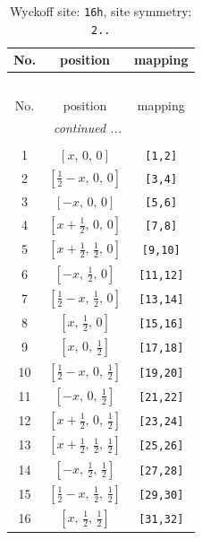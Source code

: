 \documentclass[fleqn,8pt]{jsarticle}
\begin{document}
\begin{longtable}{ccc}
\caption{Wyckoff site: {\tt 16h}, site symmetry: {\tt 2..}}
 \\
 \hline \hline
No. & position & mapping \\ \hline \endfirsthead

\multicolumn{2}{l}{\tablename\ \thetable{}} \\
 \hline \hline
No. & position & mapping \\ \hline \endhead

 \hline \hline
\multicolumn{2}{r}{\footnotesize\it continued ...} \\ \endfoot

 \hline \hline
\multicolumn{2}{r}{} \\ \endlastfoot

1 & $\left[ x,\, 0,\, 0 \right]$ & {\tt [1,2]} \\ \hline
2 & $\left[ \frac{1}{2} - x,\, 0,\, 0 \right]$ & {\tt [3,4]} \\ \hline
3 & $\left[ - x,\, 0,\, 0 \right]$ & {\tt [5,6]} \\ \hline
4 & $\left[ x + \frac{1}{2},\, 0,\, 0 \right]$ & {\tt [7,8]} \\ \hline
5 & $\left[ x + \frac{1}{2},\, \frac{1}{2},\, 0 \right]$ & {\tt [9,10]} \\ \hline
6 & $\left[ - x,\, \frac{1}{2},\, 0 \right]$ & {\tt [11,12]} \\ \hline
7 & $\left[ \frac{1}{2} - x,\, \frac{1}{2},\, 0 \right]$ & {\tt [13,14]} \\ \hline
8 & $\left[ x,\, \frac{1}{2},\, 0 \right]$ & {\tt [15,16]} \\ \hline
9 & $\left[ x,\, 0,\, \frac{1}{2} \right]$ & {\tt [17,18]} \\ \hline
10 & $\left[ \frac{1}{2} - x,\, 0,\, \frac{1}{2} \right]$ & {\tt [19,20]} \\ \hline
11 & $\left[ - x,\, 0,\, \frac{1}{2} \right]$ & {\tt [21,22]} \\ \hline
12 & $\left[ x + \frac{1}{2},\, 0,\, \frac{1}{2} \right]$ & {\tt [23,24]} \\ \hline
13 & $\left[ x + \frac{1}{2},\, \frac{1}{2},\, \frac{1}{2} \right]$ & {\tt [25,26]} \\ \hline
14 & $\left[ - x,\, \frac{1}{2},\, \frac{1}{2} \right]$ & {\tt [27,28]} \\ \hline
15 & $\left[ \frac{1}{2} - x,\, \frac{1}{2},\, \frac{1}{2} \right]$ & {\tt [29,30]} \\ \hline
16 & $\left[ x,\, \frac{1}{2},\, \frac{1}{2} \right]$ & {\tt [31,32]} \\
\end{longtable}
\end{document}
